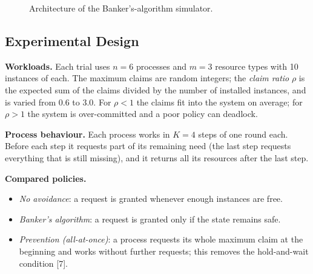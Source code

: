 \documentclass[11pt,a4paper]{report}
\begin{document}
\begin{figure}[h!]
\centering
{}
\caption{Architecture of the Banker's-algorithm simulator.}
\label{fig:arch}
\end{figure}

\subsection{Experimental Design}
\textbf{Workloads.} Each trial uses $n=6$ processes and $m=3$ resource types with 10 instances of each. The maximum claims are random integers; the \emph{claim ratio} $\rho$ is the expected sum of the claims divided by the number of installed instances, and is varied from 0.6 to 3.0. For $\rho<1$ the claims fit into the system on average; for $\rho>1$ the system is over-committed and a poor policy can deadlock.

\textbf{Process behaviour.} Each process works in $K=4$ steps of one round each. Before each step it requests part of its remaining need (the last step requests everything that is still missing), and it returns all its resources after the last step.

\textbf{Compared policies.}
\begin{itemize}
    \item \emph{No avoidance}: a request is granted whenever enough instances are free.
    \item \emph{Banker's algorithm}: a request is granted only if the state remains safe.
    \item \emph{Prevention (all-at-once)}: a process requests its whole maximum claim at the beginning and works without further requests; this removes the hold-and-wait condition [7].
\end{itemize}
\end{document}
